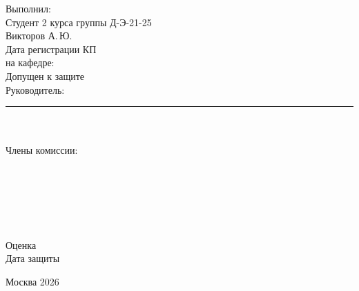 \documentclass[14pt,a4paper]{extarticle}
\begin{document}
\hspace*{0.5\textwidth}\begin{minipage}[t]{0.5\textwidth}\raggedright
Выполнил:\\ Студент 2 курса группы Д-Э-21-25\\ Викторов А.\,Ю.\\[6pt]
Дата регистрации КП\\ на кафедре:\ \makebox[3.3cm]{\hrulefill}\\[6pt]
Допущен к защите\\ Руководитель:\\[8pt]
\rule{\linewidth}{0.4pt}\\[-1pt]
\\[5pt]
Члены комиссии:\\[6pt]
\makebox[0.64\linewidth]{\hrulefill}\hspace{0.05\linewidth}\makebox[0.28\linewidth]{\hrulefill}\\[-1pt]
{\scriptsize{}\hspace{0.05\linewidth}}\\[6pt]
\makebox[0.64\linewidth]{\hrulefill}\hspace{0.05\linewidth}\makebox[0.28\linewidth]{\hrulefill}\\[-1pt]
{\scriptsize{}\hspace{0.05\linewidth}}\\[6pt]
\makebox[0.64\linewidth]{\hrulefill}\hspace{0.05\linewidth}\makebox[0.28\linewidth]{\hrulefill}\\[-1pt]
{\scriptsize{}\hspace{0.05\linewidth}}\\[6pt]
Оценка\ \makebox[0.7\linewidth]{\hrulefill}\\[5pt]
Дата защиты\ \makebox[0.6\linewidth]{\hrulefill}
\end{minipage}\par\vspace{16pt}
\centerline{Москва 2026}
\endgroup
\clearpage

\tableofcontents

\clearpage
\end{document}
